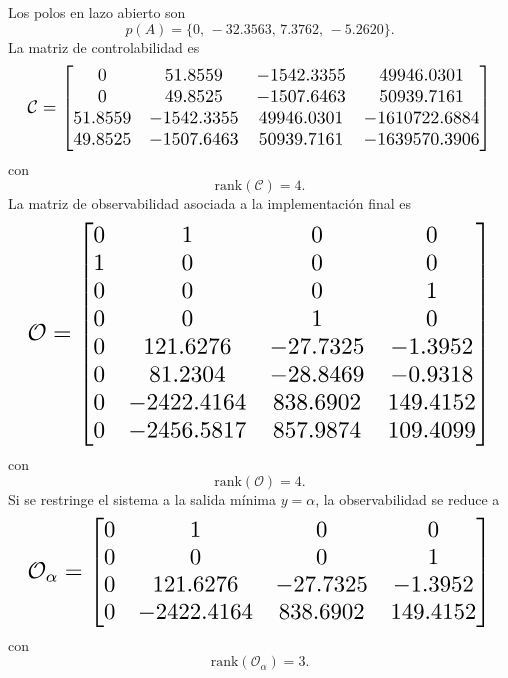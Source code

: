 \documentclass[conference]{IEEEtran}
\newcommand{\fitmat}[1]{\resizebox{0.96\columnwidth}{!}{$\displaystyle #1$}}
\begin{document}
Los polos en lazo abierto son
\begin{equation}
p(A)=\{0,\,-32.3563,\,7.3762,\,-5.2620\}.
\end{equation}
La matriz de controlabilidad es
\begin{equation}
\fitmat{
\mathcal{C}=
\begin{bmatrix}
0 & 51.8559 & -1542.3355 & 49946.0301\\
0 & 49.8525 & -1507.6463 & 50939.7161\\
51.8559 & -1542.3355 & 49946.0301 & -1610722.6884\\
49.8525 & -1507.6463 & 50939.7161 & -1639570.3906
\end{bmatrix}}
\end{equation}
con
\begin{equation}
\mathrm{rank}(\mathcal{C})=4.
\end{equation}
La matriz de observabilidad asociada a la implementaci\'on final es
\begin{equation}
\fitmat{
\mathcal{O}=
\begin{bmatrix}
0 & 1 & 0 & 0\\
1 & 0 & 0 & 0\\
0 & 0 & 0 & 1\\
0 & 0 & 1 & 0\\
0 & 121.6276 & -27.7325 & -1.3952\\
0 & 81.2304 & -28.8469 & -0.9318\\
0 & -2422.4164 & 838.6902 & 149.4152\\
0 & -2456.5817 & 857.9874 & 109.4099
\end{bmatrix}}
\end{equation}
con
\begin{equation}
\mathrm{rank}(\mathcal{O})=4.
\end{equation}
Si se restringe el sistema a la salida m\'inima $y=\alpha$, la observabilidad se reduce a
\begin{equation}
\fitmat{
\mathcal{O}_{\alpha}=
\begin{bmatrix}
0 & 1 & 0 & 0\\
0 & 0 & 0 & 1\\
0 & 121.6276 & -27.7325 & -1.3952\\
0 & -2422.4164 & 838.6902 & 149.4152
\end{bmatrix}}
\end{equation}
con
\begin{equation}
\mathrm{rank}(\mathcal{O}_{\alpha})=3.
\end{equation}
\end{document}
